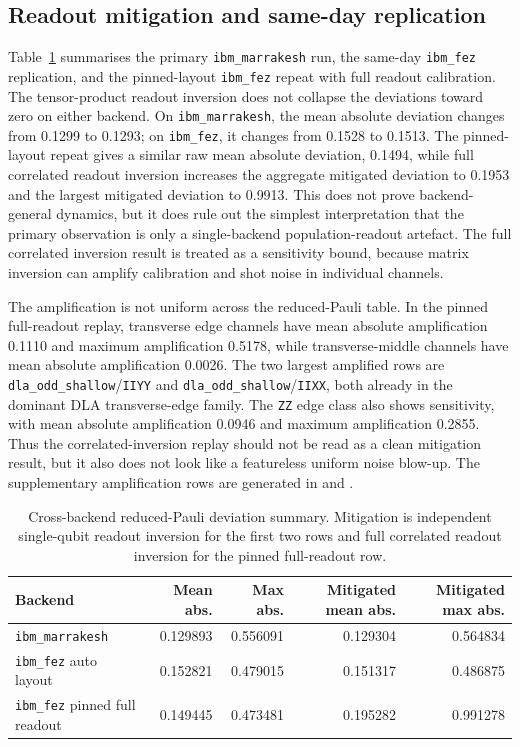 \documentclass[preprint,aps,physrev,superscriptaddress,floatfix,longbibliography]{revtex4-2}
\begin{document}
\subsection{Readout mitigation and same-day replication}

Table~\ref{tab:backend-comparison} summarises the primary
\texttt{ibm\_marrakesh} run, the same-day \texttt{ibm\_fez} replication, and
the pinned-layout \texttt{ibm\_fez} repeat with full readout calibration.
The tensor-product readout inversion does not collapse the deviations toward
zero on either backend. On \texttt{ibm\_marrakesh}, the mean absolute deviation
changes from 0.1299 to 0.1293; on \texttt{ibm\_fez}, it changes from 0.1528 to
0.1513. The pinned-layout repeat gives a similar raw mean absolute deviation,
0.1494, while full correlated readout inversion increases the aggregate
mitigated deviation to 0.1953 and the largest mitigated deviation to 0.9913.
This does not prove backend-general dynamics, but it does rule out the simplest
interpretation that the primary observation is only a single-backend
population-readout artefact. The full correlated inversion result is treated as
a sensitivity bound, because matrix inversion can amplify calibration and shot
noise in individual channels.

The amplification is not uniform across the reduced-Pauli table. In the
pinned full-readout replay, transverse edge channels have mean absolute
amplification 0.1110 and maximum amplification 0.5178, while transverse-middle
channels have mean absolute amplification 0.0026. The two largest amplified
rows are \texttt{dla\_odd\_shallow}/\texttt{IIYY} and
\texttt{dla\_odd\_shallow}/\texttt{IIXX}, both already in the dominant
DLA transverse-edge family. The \texttt{ZZ} edge class also shows
sensitivity, with mean absolute amplification 0.0946 and maximum
amplification 0.2855. Thus the correlated-inversion replay should not be read
as a clean mitigation result, but it also does not look like a featureless
uniform noise blow-up. The supplementary amplification rows are generated in
and
.

\begin{table}[tb]
\centering
\small
\begin{tabular}{lrrrr}
\toprule
Backend & Mean abs. & Max abs. & Mitigated mean abs. & Mitigated max abs. \\
\midrule
\texttt{ibm\_marrakesh} & 0.129893 & 0.556091 & 0.129304 & 0.564834 \\
\texttt{ibm\_fez} auto layout & 0.152821 & 0.479015 & 0.151317 & 0.486875 \\
\texttt{ibm\_fez} pinned full readout & 0.149445 & 0.473481 & 0.195282 & 0.991278 \\
\bottomrule
\end{tabular}
\caption{Cross-backend reduced-Pauli deviation summary. Mitigation is
independent single-qubit readout inversion for the first two rows and full
correlated readout inversion for the pinned full-readout row.}
\label{tab:backend-comparison}
\end{table}
\end{document}
